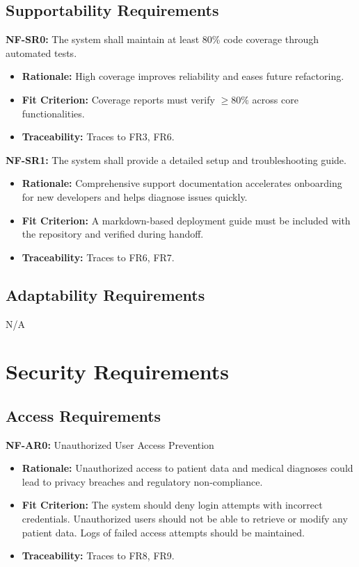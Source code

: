 \documentclass[12pt]{article}
\begin{document}
\subsection{Supportability Requirements}

\textbf{NF-SR0:} The system shall maintain at least 80\% code coverage through automated tests.
\begin{itemize}
    \item \textbf{Rationale:} High coverage improves reliability and eases future refactoring.
    \item \textbf{Fit Criterion:} Coverage reports must verify \( \geq 80\% \) across core functionalities.
    \item \textbf{Traceability:} Traces to FR3, FR6.
\end{itemize}

\textbf{NF-SR1:} The system shall provide a detailed setup and troubleshooting guide.
\begin{itemize}
    \item \textbf{Rationale:} Comprehensive support documentation accelerates onboarding for new developers and helps diagnose issues quickly.
    \item \textbf{Fit Criterion:} A markdown-based deployment guide must be included with the repository and verified during handoff.
    \item \textbf{Traceability:} Traces to FR6, FR7.
\end{itemize}

\subsection{Adaptability Requirements}
N/A

\section{Security Requirements}


\subsection{Access Requirements}

\textbf{NF-AR0:} Unauthorized User Access Prevention
\begin{itemize}
    \item \textbf{Rationale:} Unauthorized access to patient data and medical diagnoses could lead to privacy breaches and regulatory non-compliance.
    \item \textbf{Fit Criterion:} The system should deny login attempts with incorrect credentials. Unauthorized users should not be able to retrieve or modify any patient data. Logs of failed access attempts should be maintained.
    \item \textbf{Traceability:} Traces to FR8, FR9.
\end{itemize}
\end{document}
